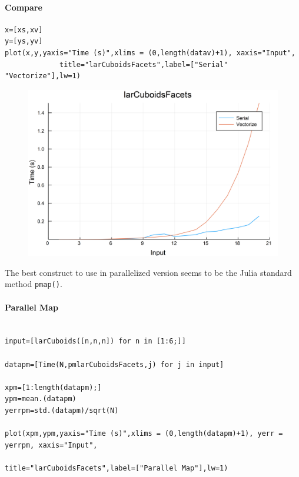 \documentclass{article}
\begin{document}
\paragraph{Compare}
\begin{flushleft}\small
\begin{list}{}{} \item
    \begin{Verbatim}[tabsize=4]
x=[xs,xv]
y=[ys,yv]
plot(x,y,yaxis="Time (s)",xlims = (0,length(datav)+1), xaxis="Input",
             title="larCuboidsFacets",label=["Serial" "Vectorize"],lw=1)
    \end{Verbatim}
\end{list}
\end{flushleft}  
\begin{figure}[h!]
\centering
\includegraphics[scale=0.06]{larCuboidsFacetsCom1.png}
\end{figure}

The best construct to use in parallelized version seems to be the Julia standard method \texttt{pmap()}.
\paragraph{Parallel Map}
\begin{flushleft}\small
\begin{list}{}{} \item
    \begin{Verbatim}[tabsize=4]

input=[larCuboids([n,n,n]) for n in [1:6;]]

datapm=[Time(N,pmlarCuboidsFacets,j) for j in input]

xpm=[1:length(datapm);]
ypm=mean.(datapm)
yerrpm=std.(datapm)/sqrt(N)

plot(xpm,ypm,yaxis="Time (s)",xlims = (0,length(datapm)+1), yerr = yerrpm, xaxis="Input", 
                                            title="larCuboidsFacets",label=["Parallel Map"],lw=1)
    \end{Verbatim}
\end{list}
\end{flushleft} 
\end{document}
